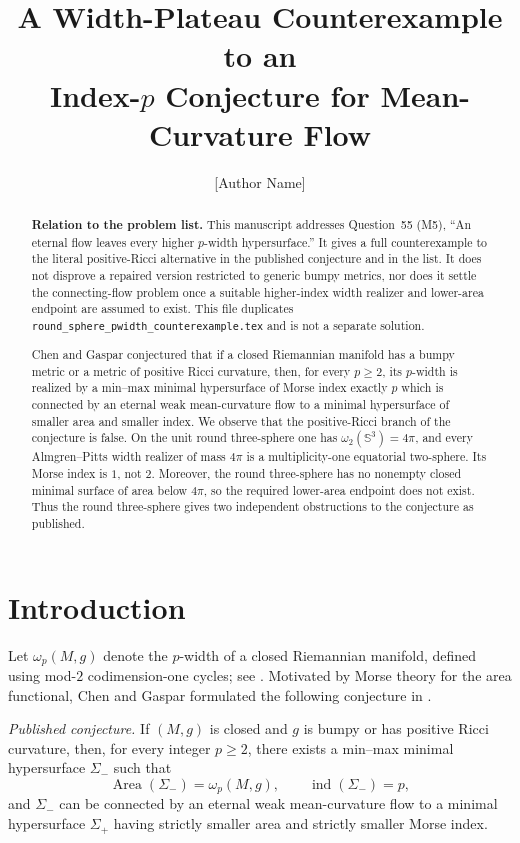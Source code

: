 \documentclass[11pt]{article}
\title{A Width-Plateau Counterexample to an\\
Index-$p$ Conjecture for Mean-Curvature Flow}
\author{[Author Name]}
\date{}
\theoremstyle{remark}
\newcommand{\Sph}{\mathbb S}
\newcommand{\ind}{\operatorname{ind}}
\newcommand{\Area}{\operatorname{Area}}
\begin{document}
\maketitle

\begin{abstract}
\textbf{Relation to the problem list.}
This manuscript addresses Question~55 (M5), ``An eternal flow leaves every
higher $p$-width hypersurface.''  It gives a full counterexample to the
literal positive-Ricci alternative in the published conjecture and in the
list.  It does not disprove a repaired version restricted to generic bumpy
metrics, nor does it settle the connecting-flow problem once a suitable
higher-index width realizer and lower-area endpoint are assumed to exist.
This file duplicates \texttt{round\_sphere\_pwidth\_counterexample.tex} and
is not a separate solution.

Chen and Gaspar conjectured that if a closed Riemannian manifold has a
bumpy metric or a metric of positive Ricci curvature, then, for every
$p\geq 2$, its $p$-width is realized by a min--max minimal hypersurface of
Morse index exactly $p$ which is connected by an eternal weak
mean-curvature flow to a minimal hypersurface of smaller area and smaller
index.  We observe that the positive-Ricci branch of the conjecture is
false.  On the unit round three-sphere one has
$\omega_2(\Sph^3)=4\pi$, and every Almgren--Pitts width realizer of
mass $4\pi$ is a
multiplicity-one equatorial two-sphere.  Its Morse index is $1$, not $2$.
Moreover, the round three-sphere has no nonempty closed minimal surface of
area below $4\pi$, so the required lower-area endpoint does not exist.
Thus the round three-sphere gives two independent obstructions to the
conjecture as published.
\end{abstract}

\section{Introduction}

Let $\omega_p(M,g)$ denote the $p$-width of a closed Riemannian manifold,
defined using mod-$2$ codimension-one cycles; see
\cite{MarquesNevesPositiveRicci,Pitts}.  Motivated by Morse theory for the
area functional, Chen and Gaspar formulated the following conjecture in
\cite[Conjecture~1]{ChenGaspar}.

\medskip
\noindent
\emph{Published conjecture.}
If $(M,g)$ is closed and $g$ is bumpy or has positive Ricci curvature,
then, for every integer $p\geq2$, there exists a min--max minimal
hypersurface $\Sigma_-$ such that
\[
  \Area(\Sigma_-)=\omega_p(M,g),
  \qquad \ind(\Sigma_-)=p,
\]
and $\Sigma_-$ can be connected by an eternal weak mean-curvature flow to
a minimal hypersurface $\Sigma_+$ having strictly smaller area and
strictly smaller Morse index.
\end{document}
